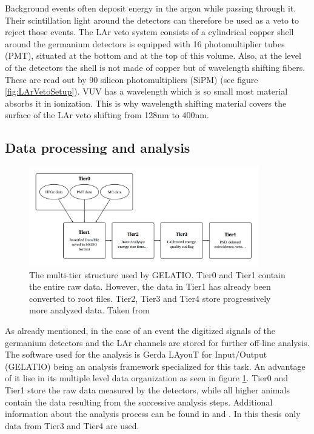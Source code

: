 \documentclass[encoding=utf8,british]{tumphthesis}
\begin{document}
Background events often deposit energy in the argon while passing through it.
Their scintillation light around the detectors can therefore be used as a veto to reject those events.
The LAr veto system consists of a cylindrical copper shell around the germanium detectors is equipped with 16 photomultiplier tubes (PMT), situated at the bottom and at the top of this volume.
Also, at the level of the detectors the shell is not made of copper but of wavelength shifting fibers.
These are read out by 90 silicon photomultipliers (SiPM)\cite{csathy_optical_2016} (see figure \ref{fig:LArVetoSetup}).
VUV has a wavelength which is so small most material absorbs it in ionization.
This is why wavelength shifting material covers the surface of the LAr veto shifting from 128nm to 400nm.
\\


\subsection{Data processing and analysis}
\label{sec:DataProc}

\label{sec:Resultsofgerda}
\begin{figure}[t!]
	\centering
		\includegraphics[width=100mm]{./Bilder/TierStructure.png}
		\caption{The multi-tier structure used by GELATIO. Tier0 and Tier1 contain the entire raw data. However, the data in Tier1 has already been converted to root files. Tier2, Tier3 and Tier4 store  progressively more analyzed data. Taken from \cite{agostini_gelatio:_2011}}
		\label{fig:TierStructure}
\end{figure}

As already mentioned, in the case of an event the digitized signals of the germanium detectors and the LAr channels are stored for further off-line analysis.
The software used for the analysis is Gerda LAyouT for Input/Output (GELATIO) being an analysis framework specialized for this task.
An advantage of it lise in its multiple level data organization as seen in figure \ref{fig:TierStructure}.
Tier0 and Tier1 store the raw data measured by the detectors, while all higher animals contain the data resulting from the successive analysis steps.
Additional information about the analysis process can be found in \cite{agostini_gelatio:_2011} and \cite{agostini_off-line_2011}.
In this thesis only data from Tier3 and Tier4 are used.
\\
\end{document}
